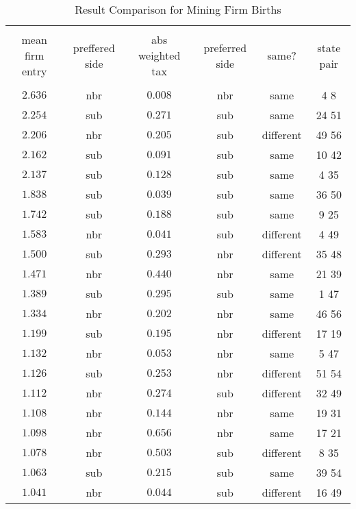 
\begin{table}[!htbp] \centering 
  \caption{Result Comparison for Mining Firm Births} 
  \label{} 
\small 
\begin{tabular}{@{\extracolsep{5pt}} cccccc} 
\\[-1.8ex]\hline 
\hline \\[-1.8ex] 
mean firm entry & preffered side & abs weighted tax & preferred side & same? & state pair \\ 
\hline \\[-1.8ex] 
$2.636$ & nbr & $0.008$ & nbr & same & 4 8  \\ 
$2.254$ & sub & $0.271$ & sub & same & 24 51  \\ 
$2.206$ & nbr & $0.205$ & sub & different & 49 56  \\ 
$2.162$ & sub & $0.091$ & sub & same & 10 42  \\ 
$2.137$ & sub & $0.128$ & sub & same & 4 35  \\ 
$1.838$ & sub & $0.039$ & sub & same & 36 50  \\ 
$1.742$ & sub & $0.188$ & sub & same & 9 25  \\ 
$1.583$ & nbr & $0.041$ & sub & different & 4 49  \\ 
$1.500$ & sub & $0.293$ & nbr & different & 35 48  \\ 
$1.471$ & nbr & $0.440$ & nbr & same & 21 39  \\ 
$1.389$ & sub & $0.295$ & sub & same & 1 47  \\ 
$1.334$ & nbr & $0.202$ & nbr & same & 46 56  \\ 
$1.199$ & sub & $0.195$ & nbr & different & 17 19  \\ 
$1.132$ & nbr & $0.053$ & nbr & same & 5 47  \\ 
$1.126$ & sub & $0.253$ & nbr & different & 51 54  \\ 
$1.112$ & nbr & $0.274$ & sub & different & 32 49  \\ 
$1.108$ & nbr & $0.144$ & nbr & same & 19 31  \\ 
$1.098$ & nbr & $0.656$ & nbr & same & 17 21  \\ 
$1.078$ & nbr & $0.503$ & sub & different & 8 35  \\ 
$1.063$ & sub & $0.215$ & sub & same & 39 54  \\ 
$1.041$ & nbr & $0.044$ & sub & different & 16 49  \\ 

\end{tabular}
\end{table}
